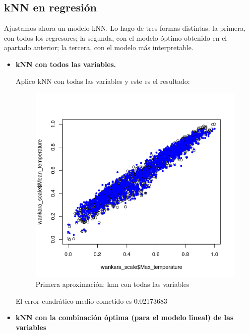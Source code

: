 \subsection{kNN en regresión}

Ajustamos ahora un modelo kNN. Lo hago de tres formas distintas: la primera, con todos los regresores; la segunda, con el modelo óptimo obtenido en el apartado anterior; la tercera, con el modelo más interpretable. \\

\begin{itemize}
	\item \textbf{kNN con todos las variables.}
	
	Aplico kNN con todas las variables y este es el resultado:
	
	\begin{figure}[H] %
		\centering
		\includegraphics[scale=0.5]{knn1.png}  %
		\caption{Primera aproximación: knn con todas las variables} 
		\label{fig:knn1}
	\end{figure}
	
	El error cuadrático medio cometido es 0.02173683
	
	\item \textbf{kNN con la combinación óptima (para el modelo lineal) de las variables}
	

\end{itemize}
